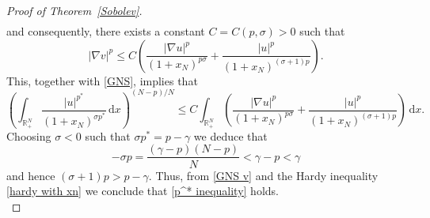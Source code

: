 \documentclass[12pt,reqno]{amsart}
\begin{document}
\begin{proof}[Proof of Theorem~\ref{Sobolev}]
\begin{align*}
		\end{align*}
		and consequently, there exists a constant $C=C(p,\sigma)>0$ such that 
		$$
			|\nabla v|^p \leq C\left(\frac{|\nabla u|^p}{(1+x_N)^{p\sigma}}+\frac{|u|^p}{(1+x_N)^{(\sigma+1)p}}\right).
		$$
		This, together with \eqref{GNS}, implies that 
		\begin{equation}\label{GNS v}
			\left(\int_{\mathds{R}^N_+}\frac{|u|^{p^*}}{(1+x_N)^{\sigma p^*}}\, \mathrm{d} x\right)^{(N-p)/N}\leq C\int_{\mathds{R}^N_+}\left(\frac{|\nabla u|^p}{(1+x_N)^{p\sigma}}+\frac{|u|^p}{(1+x_N)^{(\sigma+1)p}}\right)\, \mathrm{d} x.
		\end{equation}
		Choosing $\sigma<0$ such that $\sigma p^*=p-\gamma$ we deduce that  
		\[
		-\sigma p=\frac{(\gamma-p)(N-p)}{N}<\gamma-p<\gamma
		\]
		and hence
		$
		(\sigma+1)p>p-\gamma.
		$
		Thus, from  \eqref{GNS v} and the Hardy inequality \eqref{hardy with xn} we  conclude that  \eqref{p^* inequality} holds.\\
	

\end{proof}
\end{document}
